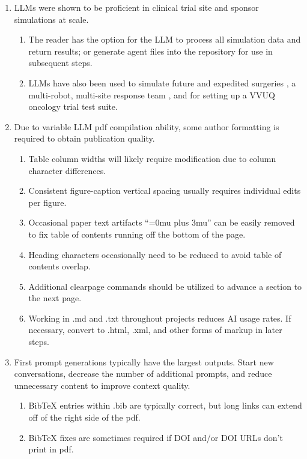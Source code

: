 \documentclass{article}
\begin{document}
\begin{enumerate}
\item LLMs were shown to be proficient in clinical trial site and sponsor simulations at scale. \cite{Darax4Sim} 
\begin{enumerate}
    \item The reader has the option for the LLM to process all simulation data and return results; or generate agent files into the repository for use in subsequent steps. \cite{Darax4Sim} 
    \item LLMs have also been used to simulate future and expedited surgeries \cite{2026GlioAI60, 2026SixtySec}, a multi-robot, multi-site response team \cite{2026ThrHum24}, and for setting up a VVUQ oncology trial test suite. \cite{2026VVUQOnco} 
\end{enumerate}
\item Due to variable LLM pdf compilation ability, some author formatting is required to obtain publication quality. 
\begin{enumerate}
    \item Table column widths will likely require modification due to column character differences. 
    \item Consistent figure-caption vertical spacing usually requires individual edits per figure.
    \item Occasional paper text artifacts “=0mu plus 3mu” can be easily removed to fix table of contents running off the bottom of the page.
    \item Heading characters occasionally need to be reduced to avoid table of contents overlap.
    \item Additional clearpage commands should be utilized to advance a section to the next page. 
    \item Working in .md and .txt throughout projects reduces AI usage rates. If necessary, convert to .html, .xml, and other forms of markup in later steps. 
\end{enumerate}
\item First prompt generations typically have the largest outputs. Start new conversations, decrease the number of additional prompts, and reduce unnecessary content to improve context quality.
\begin{enumerate}
    \item BibTeX entries within .bib are typically correct, but long links can extend off of the right side of the pdf.
    \item BibTeX fixes are sometimes required if DOI and/or DOI URLs don’t print in pdf.  

\end{enumerate}
\end{enumerate}
\end{document}
